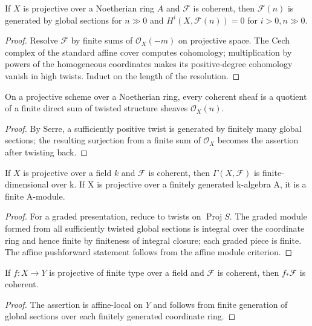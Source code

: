 \begin{theorem}[Serre]
\label{thm:II-5-17}
If $X$ is projective over a Noetherian ring $A$ and $\mathcal F$ is coherent, then
$\mathcal F(n)$ is generated by global sections for $n\gg0$ and $H^i(X,\mathcal F(n))=0$ for $i>0,n\gg0$.
\end{theorem}
\begin{proof}
Resolve $\mathcal F$ by finite sums of $\mathcal O_X(-m)$ on projective space. The Cech complex of the
standard affine cover computes cohomology; multiplication by powers of the homogeneous coordinates
makes its positive-degree cohomology vanish in high twists. Induct on the length of the resolution.
\end{proof}

\begin{corollary}
\label{cor:II-5-18}
On a projective scheme over a Noetherian ring, every coherent sheaf is a quotient of a finite direct
sum of twisted structure sheaves $\mathcal O_X(n)$.
\end{corollary}
\begin{proof}
By Serre, a sufficiently positive twist is generated by finitely many global sections; the resulting
surjection from a finite sum of $\mathcal O_X$ becomes the assertion after twisting back.
\end{proof}

\begin{theorem}
\label{thm:II-5-19}
If $X$ is projective over a field $k$ and $\mathcal F$ is coherent, then $\Gamma(X,\mathcal F)$ is finite-dimensional
over k. If X is projective over a finitely generated k-algebra A, it is a finite A-module.
\end{theorem}
\begin{proof}
For a graded presentation, reduce to twists on $\operatorname{Proj}S$. The graded module formed from
all sufficiently twisted global sections is integral over the coordinate ring and hence finite by
finiteness of integral closure; each graded piece is finite. The affine pushforward statement follows
from the affine module criterion.
\end{proof}

\begin{corollary}
\label{cor:II-5-20}
If $f:X\to Y$ is projective of finite type over a field and $\mathcal F$ is coherent, then
$f_*\mathcal F$ is coherent.
\end{corollary}
\begin{proof}
The assertion is affine-local on $Y$ and follows from finite generation of global sections over each
finitely generated coordinate ring.
\end{proof}


